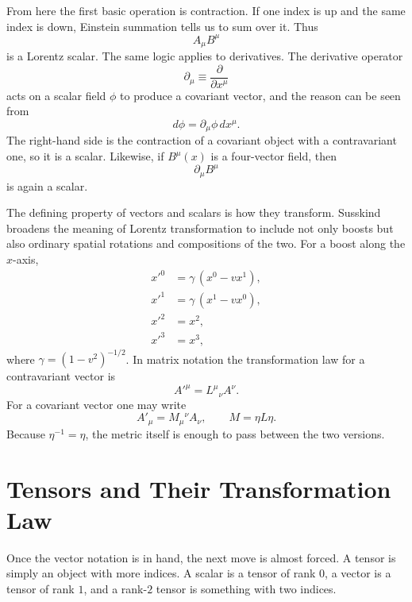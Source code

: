From here the first basic operation is contraction. If one index is up and the same index is down, Einstein summation tells us to sum over it. Thus
\begin{equation}
A_\mu B^\mu
\end{equation}
is a Lorentz scalar. The same logic applies to derivatives. The derivative operator
\begin{equation}
\partial_\mu \equiv \frac{\partial}{\partial x^\mu}
\end{equation}
acts on a scalar field $\phi$ to produce a covariant vector, and the reason can be seen from
\begin{equation}
d\phi=\partial_\mu \phi\,dx^\mu.
\end{equation}
The right-hand side is the contraction of a covariant object with a contravariant one, so it is a scalar. Likewise, if $B^\mu(x)$ is a four-vector field, then
\begin{equation}
\partial_\mu B^\mu
\end{equation}
is again a scalar.

The defining property of vectors and scalars is how they transform. Susskind broadens the meaning of Lorentz transformation to include not only boosts but also ordinary spatial rotations and compositions of the two. For a boost along the $x$-axis,
\begin{align}
x'^0 &= \gamma\,(x^0-vx^1),\\
x'^1 &= \gamma\,(x^1-vx^0),\\
x'^2 &= x^2,\\
x'^3 &= x^3,
\end{align}
where $\gamma=(1-v^2)^{-1/2}$. In matrix notation the transformation law for a contravariant vector is
\begin{equation}
A'^\mu=L^\mu{}_\nu A^\nu.
\end{equation}
For a covariant vector one may write
\begin{equation}
A'_\mu=M_\mu{}^\nu A_\nu,
\qquad
M=\eta L\eta.
\end{equation}
Because $\eta^{-1}=\eta$, the metric itself is enough to pass between the two versions.

\section{Tensors and Their Transformation Law}

Once the vector notation is in hand, the next move is almost forced. A tensor is simply an object with more indices. A scalar is a tensor of rank $0$, a vector is a tensor of rank $1$, and a rank-$2$ tensor is something with two indices.

